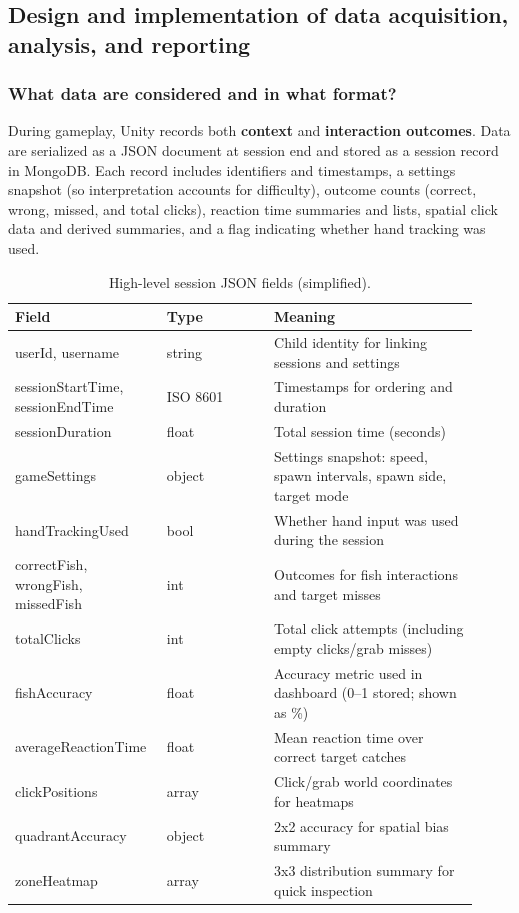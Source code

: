 \documentclass[12pt]{article}
\begin{document}
\subsection{Design and implementation of data acquisition, analysis, and reporting}
\subsubsection*{What data are considered and in what format?}
During gameplay, Unity records both \textbf{context} and \textbf{interaction outcomes}. Data are serialized as a JSON document at session end and stored as a session record in MongoDB. Each record includes identifiers and timestamps, a settings snapshot (so interpretation accounts for difficulty), outcome counts (correct, wrong, missed, and total clicks), reaction time summaries and lists, spatial click data and derived summaries, and a flag indicating whether hand tracking was used.

\begin{table}[H]
\centering
\caption{High-level session JSON fields (simplified).}
\label{tab:session_fields}
\begin{tabular}{p{0.28\linewidth} p{0.22\linewidth} p{0.42\linewidth}}
\toprule
\textbf{Field} & \textbf{Type} & \textbf{Meaning} \\
\midrule
userId, username & string & Child identity for linking sessions and settings \\
sessionStartTime, sessionEndTime & ISO 8601 & Timestamps for ordering and duration \\
sessionDuration & float & Total session time (seconds) \\
gameSettings & object & Settings snapshot: speed, spawn intervals, spawn side, target mode \\
handTrackingUsed & bool & Whether hand input was used during the session \\
correctFish, wrongFish, missedFish & int & Outcomes for fish interactions and target misses \\
totalClicks & int & Total click attempts (including empty clicks/grab misses) \\
fishAccuracy & float & Accuracy metric used in dashboard (0--1 stored; shown as \%) \\
averageReactionTime & float & Mean reaction time over correct target catches \\
clickPositions & array & Click/grab world coordinates for heatmaps \\
quadrantAccuracy & object & 2x2 accuracy for spatial bias summary \\
zoneHeatmap & array & 3x3 distribution summary for quick inspection \\
\bottomrule
\end{tabular}
\end{table}
\end{document}
